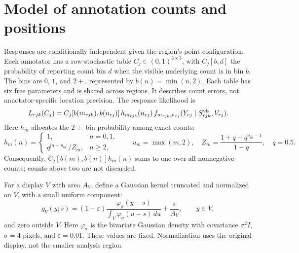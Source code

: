 \documentclass[a4paper,11pt]{article}
\begin{document}
\section*{Model of annotation counts and positions}

Responses are conditionally independent given the region's point configuration.
Each annotator has a row-stochastic table $C_j\in(0,1)^{3\times3}$, with
$C_j[b,d]$ the probability of reporting count bin $d$ when the visible
underlying count is in bin $b$. The bins are $0$, $1$, and $2+$, represented by
$b(n)=\min(n,2)$. Each table has six free parameters and is shared across
regions. It describes count errors, not annotator-specific location precision.
The response likelihood is
\begin{equation}
 L_{rjk}(C_j)
 =C_j[b(m_{rjk}),b(n_{rj})]\,h_{m_{rjk}}(n_{rj})\,
 f_{m_{rjk},n_{rj}}(Y_{rj}\mid S_{rjk}^{\rm vis},V_{rj}).
 \label{eq:likelihood}
\end{equation}
Here $h_m$ allocates the $2+$ bin probability among exact counts:
\begin{equation}
 h_m(n)=
 \begin{cases}
  1,&n=0,1,\\
  q^{|n-u_m|}/Z_m,&n\geq2,
 \end{cases}
 \qquad u_m=\max(m,2),\quad
 Z_m=\frac{1+q-q^{u_m-1}}{1-q},\quad q=0.5.
 \label{eq:tail}
\end{equation}
Consequently, $C_j[b(m),b(n)]h_m(n)$ sums to one over all nonnegative counts;
counts above two are not discarded.

For a display $V$ with area $A_V$, define a Gaussian kernel truncated and
normalized on $V$, with a small uniform component:
\begin{equation}
 g_V(y;s)=(1-\varepsilon)
 \frac{\varphi_\sigma(y-s)}{\int_V\varphi_\sigma(u-s)\,du}
 +\frac{\varepsilon}{A_V},\qquad y\in V,
 \label{eq:kernel}
\end{equation}
and zero outside $V$. Here $\varphi_\sigma$ is the bivariate Gaussian density
with covariance $\sigma^2 I$, $\sigma=4$ pixels, and $\varepsilon=0.01$.
These values are fixed. Normalization uses the original display, not the
smaller analysis region.
\end{document}
